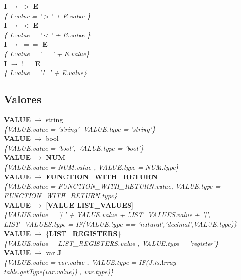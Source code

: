 \documentclass[10pt,a4paper]{article}
\begin{document}
\textbf{I} $\rightarrow$ $>$ \textbf{E} \\
\textit{\{ I.value = '$>$' + E.value  \}} \\

\textbf{I} $\rightarrow$ $<$ \textbf{E}\\
\textit{\{ I.value = '$<$' + E.value  \}} \\

\textbf{I} $\rightarrow$ $==$ \textbf{E}\\
\textit{\{ I.value =  '==' + E.value\}} \\

\textbf{I} $\rightarrow$ $!=$ \textbf{E}\\
\textit{\{ I.value =  '!=' + E.value\}} \\

\subsection{Valores}
\textbf{VALUE} $\rightarrow$ string \\
\textit{\{VALUE.value =  'string', VALUE.type = 'string'\}} \\

\textbf{VALUE} $\rightarrow$ bool   \\
\textit{\{VALUE.value =  'bool', VALUE.type = 'bool'\}} \\

\textbf{VALUE} $\rightarrow$ \textbf{NUM}   \\
\textit{\{VALUE.value =  NUM.value , VALUE.type =  NUM.type\}} \\

\textbf{VALUE} $\rightarrow$ \textbf{FUNCTION\_WITH\_RETURN} \\
\textit{\{VALUE.value =  FUNCTION\_WITH\_RETURN.value, VALUE.type = FUNCTION\_WITH\_RETURN.type\}} \\

\textbf{VALUE} $\rightarrow$ [\textbf{VALUE LIST\_VALUES}]   \\
\textit{\{VALUE.value =  '[ ' + VALUE.value + LIST\_VALUES.value + ']', LIST\_VALUES.type = IF(VALUE.type == 'natural','decimal',VALUE.type)\}} \\

\textbf{VALUE} $\rightarrow$ \{\textbf{LIST\_REGISTERS}\} \\
\textit{\{VALUE.value =  LIST\_REGISTERS.value , VALUE.type = 'register'\}} \\

\textbf{VALUE} $\rightarrow$ var \textbf{J} \\
\textit{\{VALUE.value =  var.value , VALUE.type = IF(J.isArray, table.getType(var.value)) , var.type)\}} \\
\end{document}

